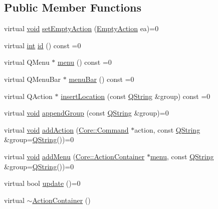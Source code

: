 \subsection*{Public Member Functions}
\begin{DoxyCompactItemize}
\item 
virtual \hyperlink{group___u_a_v_objects_plugin_ga444cf2ff3f0ecbe028adce838d373f5c}{void} \hyperlink{group___core_plugin_gae80d85ff590923f92540ca6a4b35694e}{set\-Empty\-Action} (\hyperlink{group___core_plugin_ga25957afb898f645827d8e7949c831327}{Empty\-Action} ea)=0
\item 
virtual \hyperlink{ioapi_8h_a787fa3cf048117ba7123753c1e74fcd6}{int} \hyperlink{group___core_plugin_gae3760030de490ae638ec35547d79d5da}{id} () const =0
\item 
virtual Q\-Menu $\ast$ \hyperlink{group___core_plugin_ga8e92377ca31ccb08155053b639c13059}{menu} () const =0
\item 
virtual Q\-Menu\-Bar $\ast$ \hyperlink{group___core_plugin_gaf02adf2900f7a064f59f14a8af0fe547}{menu\-Bar} () const =0
\item 
virtual Q\-Action $\ast$ \hyperlink{group___core_plugin_ga9429467e6adc07c5d348224bbc65ac54}{insert\-Location} (const \hyperlink{group___u_a_v_objects_plugin_gab9d252f49c333c94a72f97ce3105a32d}{Q\-String} \&group) const =0
\item 
virtual \hyperlink{group___u_a_v_objects_plugin_ga444cf2ff3f0ecbe028adce838d373f5c}{void} \hyperlink{group___core_plugin_ga6479409008a106faa25ceccc055c0bd6}{append\-Group} (const \hyperlink{group___u_a_v_objects_plugin_gab9d252f49c333c94a72f97ce3105a32d}{Q\-String} \&group)=0
\item 
virtual \hyperlink{group___u_a_v_objects_plugin_ga444cf2ff3f0ecbe028adce838d373f5c}{void} \hyperlink{group___core_plugin_gaae18910476f06c6af0eecd572bf1dd51}{add\-Action} (\hyperlink{class_core_1_1_command}{Core\-::\-Command} $\ast$action, const \hyperlink{group___u_a_v_objects_plugin_gab9d252f49c333c94a72f97ce3105a32d}{Q\-String} \&group=\hyperlink{group___u_a_v_objects_plugin_gab9d252f49c333c94a72f97ce3105a32d}{Q\-String}())=0
\item 
virtual \hyperlink{group___u_a_v_objects_plugin_ga444cf2ff3f0ecbe028adce838d373f5c}{void} \hyperlink{group___core_plugin_ga77e35e602ffea9dac9cf53ccd0f582a8}{add\-Menu} (\hyperlink{class_core_1_1_action_container}{Core\-::\-Action\-Container} $\ast$\hyperlink{group___core_plugin_ga8e92377ca31ccb08155053b639c13059}{menu}, const \hyperlink{group___u_a_v_objects_plugin_gab9d252f49c333c94a72f97ce3105a32d}{Q\-String} \&group=\hyperlink{group___u_a_v_objects_plugin_gab9d252f49c333c94a72f97ce3105a32d}{Q\-String}())=0
\item 
virtual bool \hyperlink{group___core_plugin_ga04932c7a13be19e6c83354411964d848}{update} ()=0
\item 
virtual \hyperlink{group___core_plugin_gadce9ee76d4dad19beb7d474531bb7579}{$\sim$\-Action\-Container} ()
\end{DoxyCompactItemize}


